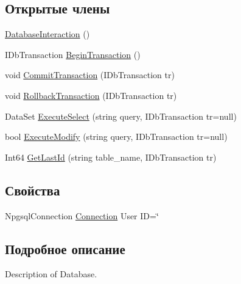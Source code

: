 \subsection*{Открытые члены}
\begin{DoxyCompactItemize}
\item 
\hyperlink{class_sample_shop_server_1_1_model_1_1_database_interaction_a68c474299b0b8960529079dbc703111e}{Database\+Interaction} ()
\item 
I\+Db\+Transaction \hyperlink{class_sample_shop_server_1_1_model_1_1_database_interaction_a8564c937b8c0a5368ba496b5228748d3}{Begin\+Transaction} ()
\item 
void \hyperlink{class_sample_shop_server_1_1_model_1_1_database_interaction_ae6a64c4a8d3cdaffc7ba8e9001673d45}{Commit\+Transaction} (I\+Db\+Transaction tr)
\item 
void \hyperlink{class_sample_shop_server_1_1_model_1_1_database_interaction_ad2efb89b79dcd8fe473bb169a46ea16a}{Rollback\+Transaction} (I\+Db\+Transaction tr)
\item 
Data\+Set \hyperlink{class_sample_shop_server_1_1_model_1_1_database_interaction_acafc2bc549b0f01271475a0d7fef747e}{Execute\+Select} (string query, I\+Db\+Transaction tr=null)
\item 
bool \hyperlink{class_sample_shop_server_1_1_model_1_1_database_interaction_a008c3a9df152ccb7291a4d6267193c74}{Execute\+Modify} (string query, I\+Db\+Transaction tr=null)
\item 
Int64 \hyperlink{class_sample_shop_server_1_1_model_1_1_database_interaction_a49ee1e3cd55abeb3b62de784664ef5dc}{Get\+Last\+Id} (string table\+\_\+name, I\+Db\+Transaction tr)
\end{DoxyCompactItemize}
\subsection*{Свойства}
\begin{DoxyCompactItemize}
\item 
Npgsql\+Connection \hyperlink{class_sample_shop_server_1_1_model_1_1_database_interaction_a1d4f03db76711dec47dd9c51adee1f66}{Connection} User I\+D=\char`\"{}
\end{DoxyCompactItemize}


\subsection{Подробное описание}
Description of Database. 



